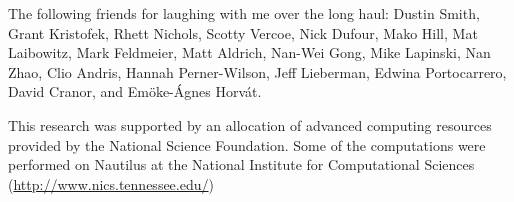 \noindent
The following friends for laughing with me over the long haul:
Dustin Smith, %
Grant Kristofek, %
Rhett Nichols,
Scotty Vercoe,
Nick Dufour,
Mako Hill, %
Mat Laibowitz, %
Mark Feldmeier, %
Matt Aldrich, %
Nan-Wei Gong, %
Mike Lapinski, %
Nan Zhao, %
Clio Andris, %
Hannah Perner-Wilson, %
Jeff Lieberman, %
Edwina Portocarrero, %
David Cranor, and %
Em\"{o}ke-\'{A}gnes Horv\'{a}t. %

\vspace{5mm}

\vspace{5mm}

\noindent
This research was supported by an allocation of advanced computing
resources provided by the National Science Foundation.  Some of the
computations were performed on Nautilus at the National Institute for
Computational Sciences (\url{http://www.nics.tennessee.edu/})

\endgroup

